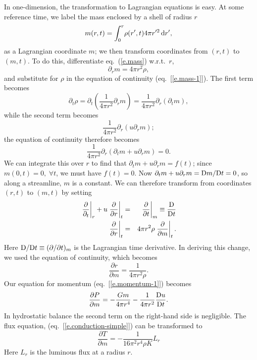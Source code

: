 In one-dimension, the transformation to Lagrangian equations is easy.  At some reference time, we label the mass enclosed by a shell of radius $r$
\begin{equation}\label{e.mass}
	m(r,t) = \int_{0}^{r}\! \rho(r',t) 4\pi r'^{2} \,\mathrm{d} r',
\end{equation}
as a Lagrangian coordinate $m$; we then transform coordinates from $(r,t)$ to $(m,t)$.
To do this, differentiate eq.~(\ref{e.mass}) w.r.t.\ $r$,
\[ \partial_{r}m = 4\pi r^{2}\rho, \]
and substitute for $\rho$ in the equation of  continuity (eq.~[\ref{e.mass-1}]).  The first term becomes
\[ 
	\partial_{t}\rho = \partial_{t}\left(\frac{1}{4\pi r^{2}} \partial_{r} m\right) 
	= \frac{1}{4\pi r^{2}}\partial_{r}(\partial_{t}m),
\]
while the second term becomes
\[
	\frac{1}{4\pi r^{2}}\partial_{r}\left(u\partial_{r}m\right);
\]
the equation of continuity therefore becomes
\begin{equation}\label{e.mod-continuity}
	\frac{1}{4\pi r^{2}} \partial_{r}\left( \partial_{t} m + u\partial_{r} m\right) = 0.
\end{equation}
We can integrate this over $r$ to find that $\partial_{t} m + u\partial_{r} m = f(t)$; since $m(0,t) = 0,\;\forall t$, we must have $f(t) = 0$.  Now $\partial_{t} m + u\partial_{r} m = \mathrm{D} m/\mathrm{D} t = 0$, so along a streamline, $m$ is a constant.  We can therefore transform from coordinates $(r,t)$ to $(m,t)$ by setting
\begin{eqnarray}
	\label{e.lagrange-rule-1}
	\left.\frac{\partial}{\partial_{t}}\right|_{r} + u\left.\frac{\partial}{\partial r}\right|_{t} 
	&=& \left.\frac{\partial}{\partial t}\right|_{m} \equiv \frac{\mathrm{D}}{\mathrm{D} t}\\
	\label{e.lagrange-rule-2}
	\left.\frac{\partial}{\partial r}\right|_{t} &=& 4\pi r^{2}\rho \left.\frac{\partial}{\partial m}\right|_{t}.
\end{eqnarray}
Here $\mathrm{D}/\mathrm{D} t \equiv (\partial/\partial t)_{m}$ is the Lagrangian time derivative.  In deriving this change, we used the equation of continuity, which becomes
\begin{equation}\label{e.lagrange-r}
\frac{\partial r}{\partial m} = \frac{1}{4\pi r^{2}\rho}.
\end{equation}
Our equation for momentum (eq.~[\ref{e.momentum-1}]) becomes
\begin{equation}\label{e.lagrange-momentum}
\frac{\partial P}{\partial m} = -\frac{Gm}{4\pi r^{4}} - \frac{1}{4\pi r^{2}}\frac{\mathrm{D} u}{\mathrm{D} t}.
\end{equation}
In hydrostatic balance the second term on the right-hand side is negligible.  
The flux equation, (eq.~[\ref{e.conduction-simple}]) can be transformed to
\begin{equation}\label{e.lagrange-flux}
\frac{\partial T}{\partial m} = - \frac{1}{16\pi^{2} r^{4}\rho K}L_{r}
\end{equation}
Here $L_{r}$ is the luminous flux at a radius $r$. 

